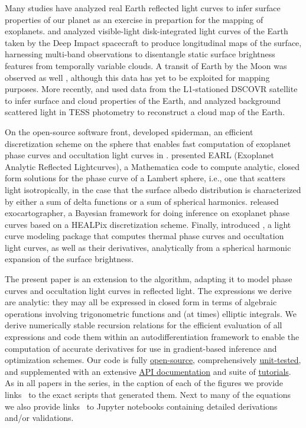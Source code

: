 \documentclass[modern]{aastex62}
\begin{document}
Many studies have analyzed real Earth reflected light curves to
infer surface properties of our planet as an exercise in
prepartion for the mapping of exoplanets.
%
\citet{Cowan2009} and \citet{Cowan2011b} analyzed visible-light disk-integrated light curves
of the Earth taken by the Deep Impact spacecraft to produce
longitudinal maps of the surface, harnessing multi-band observations
to disentangle static surface brightness features from temporally
variable clouds.  A transit of Earth by the Moon was observed
as well \citep{Livengood2011}, although this data has yet to be
exploited for mapping purposes.
More recently, \citet{Jiang2018} and \citet{Fan2019}
used data from the L1-stationed DSCOVR satellite to infer surface
and cloud properties of the Earth, and \citet{Luger2019b} analyzed
background scattered light in TESS photometry to reconstruct a cloud
map of the Earth.

On the open-source software front, \citet{Louden2018} developed
\textsf{spiderman}, an efficient discretization scheme
on the sphere that enables fast computation of exoplanet
phase curves and occultation light curves in \Python.
%
\citet{Haggard2018} presented
\textsf{EARL} (Exoplanet Analytic Reflected Lightcurves),
a \textsf{Mathematica} code to compute analytic, closed form
solutions for the phase curve of a Lambert sphere, i.e., one that
scatters light isotropically, in the case that the surface albedo
distribution is characterized by either a sum of delta functions
or a sum of spherical harmonics.
%
\citet{Farr2018} released \textsf{exocartographer}, a Bayesian
framework for doing inference on exoplanet phase curves based on
a HEALPix \citep{healpix} discretization scheme.
%
Finally, \citet{Luger2019} introduced \starry, a light curve
modeling package that computes thermal phase curves and occultation
light curves, as well as their derivatives, analytically from a spherical
harmonic expansion of the surface brightness.

The present paper is an extension to the \starry algorithm,
adapting it to model phase curves and occultation light curves
in reflected light. The expressions
we derive are analytic: they may all be expressed in closed form
in terms of algebraic operations involving trigonometric functions
and (at times) elliptic integrals. We derive numerically
stable recursion relations for the efficient evaluation of all
expressions and code them within an autodifferentiation framework
to enable the computation of accurate derivatives for use in
gradient-based inference and optimization schemes.
Our code is fully
\href{https://github.com/rodluger/starry}{open-source},
comprehensively
\href{https://dev.azure.com/rodluger/starry/_test/analytics?definitionId=4}{unit-tested},
and supplemented with an extensive
\href{https://starry.readthedocs.io}{API documentation}
and suite of
\href{https://starry.readthedocs.io/en/latest/tutorials/}{tutorials}.
%
As in all papers in the \starry series, in the caption of each of the figures
we provide links \codeicon\ to the exact \Python scripts that
generated them. Next to many of the equations we also provide
links \prooficon\ to \textsf{Jupyter} notebooks containing
detailed derivations and/or validations.
\end{document}
